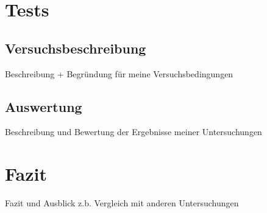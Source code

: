 
\chapter{Tests}
\section{Versuchsbeschreibung}
Beschreibung + Begründung für meine Versuchsbedingungen
\section{Auswertung}
Beschreibung und Bewertung der Ergebnisse meiner Untersuchungen

\chapter{Fazit}
Fazit und Ausblick
z.b. Vergleich mit anderen Untersuchungen

